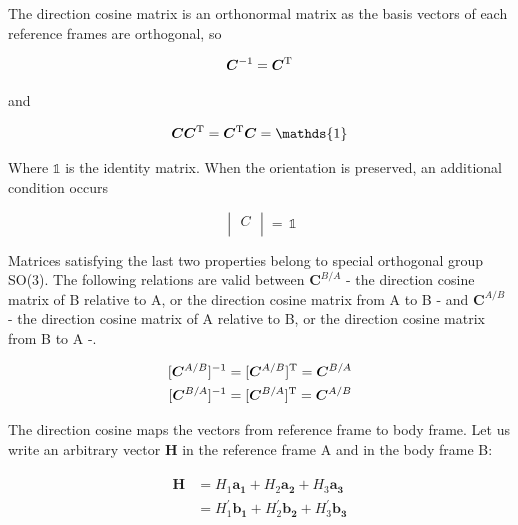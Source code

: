 The direction cosine matrix is an orthonormal matrix as the basis vectors of each reference frames are orthogonal, so

\begin{equation}
\label{eqn:orthonormality}
\bm{C}^{-1} = \bm{C}^{\rm T}
\end{equation}

and

\begin{equation}
\label{eqn:orthonormality2}
\bm{C}\bm{C}^{\rm T} = \bm{C}^{\rm T}\bm{C} = \mathds{1}
\end{equation}

Where $\mathds{1}$ is the identity matrix.
When the orientation is preserved, an additional condition occurs

\begin{equation}
\label{eqn:noRotation}
\begin{vmatrix}
C\\[0.01em]
\end{vmatrix}
=\,
\mathds{1}
\end{equation}

Matrices satisfying the last two properties belong to special orthogonal group SO(3). 
The following relations are valid between $\bm{C}^{B/A}$ - the direction cosine matrix of B relative to A, or the direction cosine matrix from A to B - and $\bm{C}^{A/B}$ - the direction cosine matrix of A relative to B, or the direction cosine matrix from B to A -.

\begin{align}
\label{eqn:C_B_A_vs_C_A_B}
\begin{split}
[\bm{C}^{A/B}]^{-1} = [\bm{C}^{A/B}]^{\rm T} = \bm{C}^{B/A} 
\\
[\bm{C}^{B/A}]^{-1} = [\bm{C}^{B/A}]^{\rm T} = \bm{C}^{A/B}
\end{split}
\end{align}

The direction cosine maps the vectors from reference frame to body frame.  
Let us write an arbitrary vector $\bm{H}$ in the reference frame A and in the body frame B:

\begin{align}
\label{eqn:vectorInRefFrame}
\begin{split}
\bm{H} & = H_1 \bm{a_1} + H_2 \bm{a_2} + H_3 \bm{a_3}
\\
& = H_1^{'} \bm{b_1} + H_2^{'} \bm{b_2} + H_3^{'} \bm{b_3}
\end{split}
\end{align}


